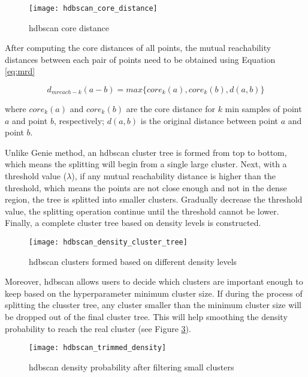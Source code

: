 \documentclass[a4paper,man,floatsintext,natbib,noextraspace]{apa6}
\begin{document}
\begin{figure}[h!]
    \centering
    \captionsetup{justification=centering}
    \texttt{[image: hdbscan\_core\_distance]}
    \caption{\gls{hdbscan} core distance}\label{fig:hdbscan_core_distance}
\end{figure}  

After computing the core distances of all points, the mutual reachability distances between each pair of points need to be obtained using Equation \eqref{eq:mrd}

\begin{equation}\label{eq:mrd}
    d_{mreach-k}(a-b) = max\{core_{k}(a),core_{k}(b),d(a,b)\}
\end{equation}

where $core_{k}(a)$ and $core_{k}(b)$ are the core distance for $k$ min samples of point $a$ and point $b$, respectively; $d(a,b)$ is the original distance between point $a$ and point $b$. 

Unlike Genie method, an \gls{hdbscan} cluster tree is formed from top to bottom, which means the splitting will begin from a single large cluster. Next, with a threshold value ($\lambda$), if any mutual reachability distance is higher than the threshold, which means the points are not close enough and not in the dense region, the tree is splitted into smaller clusters. Gradually decrease the threshold value, the splitting operation continue until the threshold cannot be lower. Finally, a complete cluster tree based on density levels is constructed.

\begin{figure}[h!]
    \centering
    \captionsetup{justification=centering}
    \texttt{[image: hdbscan\_density\_cluster\_tree]}
    \caption{\gls{hdbscan} clusters formed based on different density levels}\label{fig:hdbscan_density_cluster_tree}
\end{figure}  

Moreover, \gls{hdbscan} allows users to decide which clusters are important enough to keep based on the hyperparameter minimum cluster size. If during the process of splitting the clusster tree, any cluster smaller than the minimum cluster size will be dropped out of the final cluster tree. This will help smoothing the density probability to reach the real cluster (see Figure \ref{fig:hdbscan_trimmed_density}).

\begin{figure}[h!]
    \centering
    \captionsetup{justification=centering}
    \texttt{[image: hdbscan\_trimmed\_density]}
    \caption{\gls{hdbscan} density probability after filtering small clusters}\label{fig:hdbscan_trimmed_density}
\end{figure}  
\end{document}
